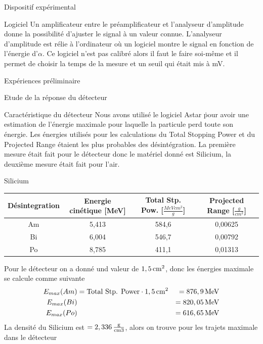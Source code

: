 \documentclass[a4paper,11pt]{scrartcl}
\begin{document}
\begin{section}{Dispositif expérimental}
  \begin{subsection}{Logiciel}
   Un amplificateur entre le préamplificateur et l'analyseur d'amplitude donne la possibilité d'ajuster le signal à un valeur connue. L'analyseur d'amplitude est rélie à l'ordinateur où un logiciel montre le signal en fonction de l'énergie d'$\alpha$. Ce logiciel n'est pas calibré alors il faut le faire soi-même et il permet de choisir la temps de la mesure et un seuil qui était mis à \unit[200]{mV}.
  \end{subsection}
 \end{section}
  
 \begin{section}{Expériences préliminaire}
  \begin{subsection}{Etude de la réponse du détecteur}
   \begin{subsubsection}{Caractéristique du détecteur}
   Nous avons utilisé le logiciel \flqq Astar \frqq \. pour avoir une estimation de l'énergie maximale pour laquelle la particule perd toute son énergie.  Les énergies utilisés pour les calculations du Total Stopping Power et du Projected Range étaient les plus probables des désintégration. La première mesure était fait pour le détecteur donc le matériel donné est Silicium, la deuxième mesure était fait pour l'air.
   \begin{paragraph}{Silicium}
    \begin{center}
     \begin{tabular}{c|c|c|c}
      Désintegration&	Energie cinétique [MeV] & Total Stp. Pow. [$\frac{MeV cm^2}{g}$]  & Projected Range [$\frac{g}{cm^2}$] \\ \hline
      Am 	&5,413 & 584,6 & 0,00625 \\ 
      Bi	&6,004 & 546,7 & 0,00792 \\ 
      Po	&8,785 & 411,1 & 0,01313 \\ 
     \end{tabular}
    \end{center}
    Pour le détecteur on a donné und valeur de $\unit[1,5]{cm^2}$, donc les énergies maximale se calcule comme suivante 
    \begin{eqnarray*}
     E_{max}(Am)&=\text{Total Stp. Power}\cdot \unit[1,5]{cm^2}&=\unit[876,9]{MeV}\\
     E_{max}(Bi)&&=\unit[820,05]{MeV}\\
     E_{max}(Po)&&=\unit[616,65]{MeV}
    \end{eqnarray*}
    La densité du Silicium est $\rho=\unit[2,336]{\frac{g}{cm3}}$, alors on trouve pour les trajets maximale dans le détecteur

\end{paragraph}
\end{subsubsection}
\end{subsection}
\end{section}
\end{document}

